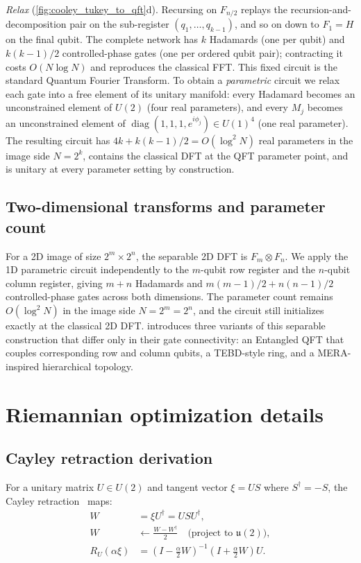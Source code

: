 \documentclass[a4paper, twocolumn]{quantumarticle}
\newcommand{\diag}{\operatorname{diag}}
\begin{document}
\emph{Relax} (\cref{fig:cooley_tukey_to_qft}d). Recursing on $F_{n/2}$ replays the recursion-and-decomposition pair on the sub-register $(q_1, \ldots, q_{k-1})$, and so on down to $F_1 = H$ on the final qubit.
The complete network has $k$ Hadamards (one per qubit) and $k(k-1)/2$ controlled-phase gates (one per ordered qubit pair); contracting it costs $O(N \log N)$ and reproduces the classical FFT.
This fixed circuit is the standard Quantum Fourier Transform.
To obtain a \emph{parametric} circuit we relax each gate into a free element of its unitary manifold: every Hadamard becomes an unconstrained element of $U(2)$ (four real parameters), and every $M_j$ becomes an unconstrained element of $\diag(1, 1, 1, e^{i\phi_j}) \in U(1)^4$ (one real parameter).
The resulting circuit has $4k + k(k-1)/2 = O(\log^2 N)$ real parameters in the image side $N = 2^k$, contains the classical DFT at the QFT parameter point, and is unitary at every parameter setting by construction.

\subsection{Two-dimensional transforms and parameter count}

For a 2D image of size $2^m \times 2^n$, the separable 2D DFT is $F_m \otimes F_n$.
We apply the 1D parametric circuit independently to the $m$-qubit row register and the $n$-qubit column register, giving $m + n$ Hadamards and $m(m-1)/2 + n(n-1)/2$ controlled-phase gates across both dimensions.
The parameter count remains $O(\log^2 N)$ in the image side $N = 2^m = 2^n$, and the circuit still initializes exactly at the classical 2D DFT.
 introduces three variants of this separable construction that differ only in their gate connectivity: an Entangled QFT that couples corresponding row and column qubits, a TEBD-style ring, and a MERA-inspired hierarchical topology.

\FloatBarrier
\section{Riemannian optimization details}
\label{app:riemannian}

\subsection{Cayley retraction derivation}
\label{app:cayley}

For a unitary matrix $U \in U(2)$ and tangent vector $\xi = US$ where $S^\dagger = -S$, the Cayley retraction~\cite{wen2013feasible, li2020efficient, tagare2011notes} maps:
\begin{align}
  W &= \xi U^\dagger = USU^\dagger, \\
  W &\leftarrow \frac{W - W^\dagger}{2} \quad \text{(project to } \mathfrak{u}(2)\text{)}, \\
  R_U(\alpha \xi) &= \left(I - \frac{\alpha}{2}W\right)^{-1}\left(I + \frac{\alpha}{2}W\right)U.
\end{align}
\end{document}
